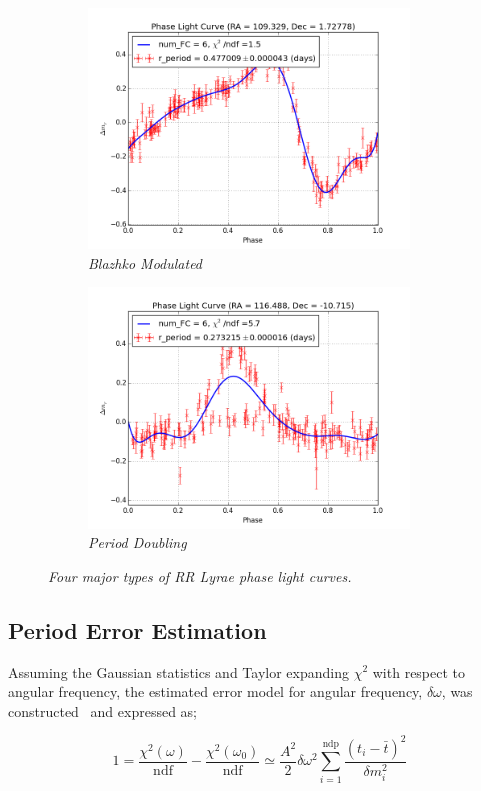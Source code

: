 \documentclass[aps,prb,twocolumn,superscriptaddress]{revtex4-1}
\begin{document}
\begin{figure}
	\begin{subfigure}{.5\textwidth}
	  \centering
			\includegraphics[width=3.35in]{figures/rPLCneg45E_limit2_grp_109+01_09693.png}
		\caption{\it \small{Blazhko Modulated \citep{RRLyrae}}}
		\label{fig:Tc}
	\end{subfigure}%
	\begin{subfigure}{.5\textwidth}
	  \centering
			\includegraphics[width=3.35in]{figures/rPLCneg45E_limit2_grp_116-11_03117.png}
		\caption{\it \small{Period Doubling}}
		\label{fig:Tc}
	\end{subfigure}%
	\caption{\it \small{Four major types of RR Lyrae phase light curves.}}
	\label{fig:Type}
\end{figure}


	
\subsection{Period Error Estimation}

Assuming the Gaussian statistics and Taylor expanding $\chi^2$ with respect to angular frequency, the estimated error model for angular frequency, $\delta \omega$, was constructed~\citep{gri} and expressed as;

\begin{equation}
\label{AFEE}
1 = \frac{\chi^2(\omega)}{\text{ndf}} - \frac{\chi^2(\omega_0)}{\text{ndf}} \simeq \frac{A^2}{2} \delta \omega^2 \sum_{i=1}^{\text{ndp}} \frac{(t_i - \bar{t})^2}{\delta m^2_i}
\end{equation}
\end{document}
